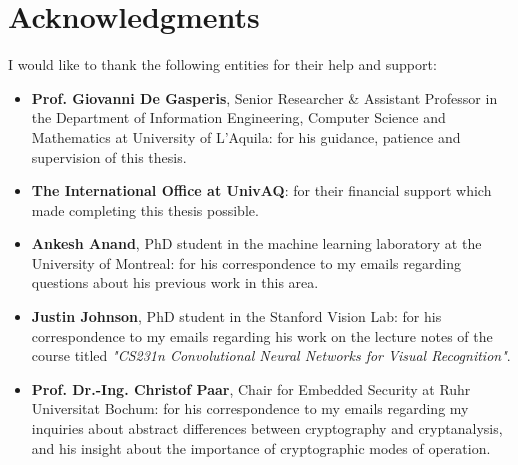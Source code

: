 \documentclass[a4paper, 12pt]{report}
\begin{document}
\chapter*{Acknowledgments}
I would like to thank the following entities for their help and support:
\begin{itemize}
	\item \textbf{Prof. Giovanni De Gasperis}, Senior Researcher \& Assistant Professor in the Department of Information Engineering, Computer Science and Mathematics at University of L'Aquila: for his guidance, patience and supervision of this thesis.
	\item \textbf{The International Office at UnivAQ}: for their financial support which made completing this thesis possible.
	\item \textbf{Ankesh Anand}, PhD student in the machine learning laboratory at the University of Montreal: for his correspondence to my emails regarding questions about his previous work in this area\citep{ankeshanand/neural-cryptography-tensorflow}.
	\item \textbf{Justin Johnson}, PhD student in the Stanford Vision Lab: for his correspondence to my emails regarding his work on the lecture notes of the course titled \textit{"CS231n Convolutional Neural Networks for Visual Recognition"}\citep{cs231n}.
	\item \textbf{Prof. Dr.-Ing. Christof Paar}, Chair for Embedded Security at Ruhr Universitat Bochum: for his correspondence to my emails regarding my inquiries about abstract differences between cryptography and cryptanalysis, and his insight about the importance of cryptographic modes of operation.
\end{itemize}
\newpage
\medskip


\end{document}

